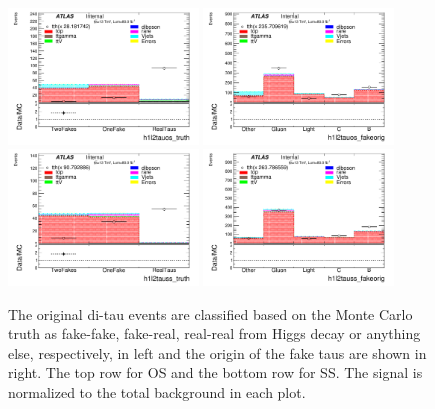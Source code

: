 \begin{figure}[htbp]
\centering
\begin{center}
  \includegraphics[width=0.45\textwidth, keepaspectratio]{fig/OneLepTwoTaus/Plots_h1l2tauos_truth_signal.pdf}
  \includegraphics[width=0.45\textwidth, keepaspectratio]{fig/OneLepTwoTaus/Plots_h1l2tauos_fakeorig_signal.pdf}
  \includegraphics[width=0.45\textwidth, keepaspectratio]{fig/OneLepTwoTaus/Plots_h1l2tauss_truth_signal.pdf}
  \includegraphics[width=0.45\textwidth, keepaspectratio]{fig/OneLepTwoTaus/Plots_h1l2tauss_fakeorig_signal.pdf}
\end{center}
\caption{The original di-tau events are classified based on the Monte Carlo truth as fake-fake, fake-real, real-real from Higgs decay or 
anything else, respectively, in left and the origin of the fake taus are shown in right. The top row for OS and the bottom row for SS. The signal is normalized to the total background in each plot.}
\label{Fig:1l2tau.truth}
\end{figure}

